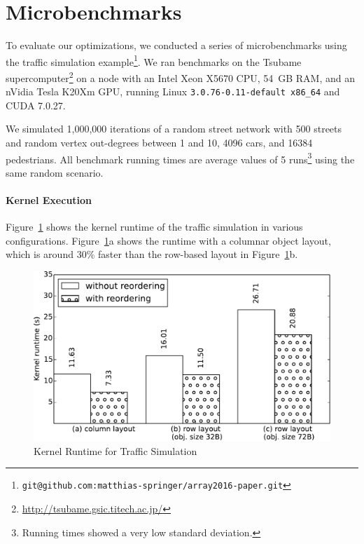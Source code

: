 \documentclass[preprint]{sigplanconf}
\begin{document}
\section{Microbenchmarks}
To evaluate our optimizations, we conducted a series of microbenchmarks using the traffic simulation example\footnote{\texttt{git@github.com:matthias-springer/array2016-paper.git}}. We ran benchmarks on the Tsubame supercomputer\footnote{\url{http://tsubame.gsic.titech.ac.jp/}} on a node with an Intel Xeon X5670 CPU, 54~GB RAM, and an nVidia Tesla K20Xm GPU, running Linux \texttt{3.0.76-0.11-default x86\_64} and CUDA 7.0.27.

We simulated 1,000,000 iterations of a random street network with 500 streets and random vertex out-degrees between 1 and 10, 4096 cars, and 16384 pedestrians. All benchmark running times are average values of 5 runs\footnote{Running times showed a very low standard deviation.} using the same random scenario.

\paragraph{Kernel Execution}
Figure~\ref{fig:bench_kernel} shows the kernel runtime of the traffic simulation in various configurations. Figure~\ref{fig:bench_kernel}a shows the runtime with a columnar object layout, which is around 30\% faster than the row-based layout in Figure~\ref{fig:bench_kernel}b.

\begin{figure}[!htp]
    \includegraphics[width=\columnwidth]{bench_1.pdf}
    \centering
    \caption{Kernel Runtime for Traffic Simulation}
    \label{fig:bench_kernel}
\end{figure}
\end{document}
